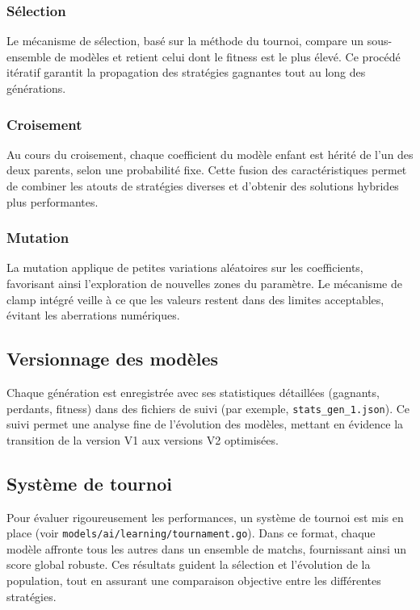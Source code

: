 \documentclass[a4paper,12pt]{article}
\begin{document}
\subsubsection{Sélection}
Le mécanisme de sélection, basé sur la méthode du tournoi, compare un sous-ensemble de modèles et retient celui dont le fitness est le plus élevé. Ce procédé itératif garantit la propagation des stratégies gagnantes tout au long des générations.

\subsubsection{Croisement}
Au cours du croisement, chaque coefficient du modèle enfant est hérité de l'un des deux parents, selon une probabilité fixe. Cette fusion des caractéristiques permet de combiner les atouts de stratégies diverses et d’obtenir des solutions hybrides plus performantes.

\subsubsection{Mutation}
La mutation applique de petites variations aléatoires sur les coefficients, favorisant ainsi l'exploration de nouvelles zones du paramètre. Le mécanisme de clamp intégré veille à ce que les valeurs restent dans des limites acceptables, évitant les aberrations numériques.

\subsection{Versionnage des modèles}
Chaque génération est enregistrée avec ses statistiques détaillées (gagnants, perdants, fitness) dans des fichiers de suivi (par exemple, \texttt{stats\_gen\_1.json}). Ce suivi permet une analyse fine de l'évolution des modèles, mettant en évidence la transition de la version V1 aux versions V2 optimisées.

\subsection{Système de tournoi}
Pour évaluer rigoureusement les performances, un système de tournoi est mis en place (voir \texttt{models/ai/learning/tournament.go}). Dans ce format, chaque modèle affronte tous les autres dans un ensemble de matchs, fournissant ainsi un score global robuste. Ces résultats guident la sélection et l'évolution de la population, tout en assurant une comparaison objective entre les différentes stratégies.
\end{document}
